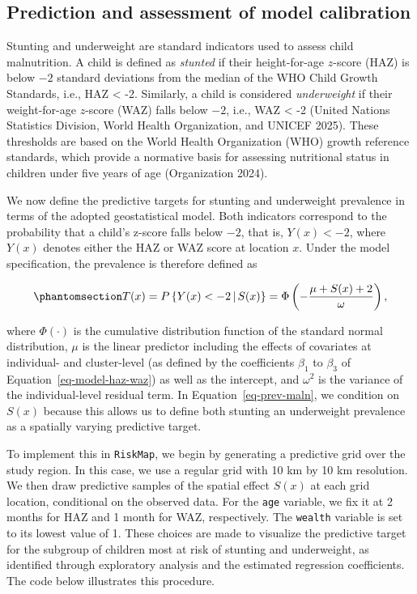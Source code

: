 \documentclass[
  letterpaper,
]{krantz}
\begin{document}
\subsection{Prediction and assessment of model
calibration}\label{prediction-and-assessment-of-model-calibration}

Stunting and underweight are standard indicators used to assess child
malnutrition. A child is defined as \textit{stunted} if their
height-for-age \(z\)-score (HAZ) is below \(-2\) standard deviations
from the median of the WHO Child Growth Standards, i.e., HAZ \textless{}
-2. Similarly, a child is considered \textit{underweight} if their
weight-for-age \(z\)-score (WAZ) falls below \(-2\), i.e., WAZ
\textless{} -2 (United Nations Statistics Division, World Health
Organization, and UNICEF 2025). These thresholds are based on the World
Health Organization (WHO) growth reference standards, which provide a
normative basis for assessing nutritional status in children under five
years of age (Organization 2024).

We now define the predictive targets for stunting and underweight
prevalence in terms of the adopted geostatistical model. Both indicators
correspond to the probability that a child's z-score falls below \(-2\),
that is, \(Y(x) < -2\), where \(Y(x)\) denotes either the HAZ or WAZ
score at location \(x\). Under the model specification, the prevalence
is therefore defined as

\begin{equation}\phantomsection\label{eq-prev-maln}{
T(x) = P\left\{ Y(x) < -2 \,\middle|\, S(x) \right\} = \Phi\left( -\frac{\mu + S(x) + 2}{\omega} \right),
}\end{equation}

where \(\Phi(\cdot)\) is the cumulative distribution function of the
standard normal distribution, \(\mu\) is the linear predictor including
the effects of covariates at individual- and cluster-level (as defined
by the coefficients \(\beta_1\) to \(\beta_3\) of
Equation~\ref{eq-model-haz-waz}) as well as the intercept, and
\(\omega^2\) is the variance of the individual-level residual term. In
Equation~\ref{eq-prev-maln}, we condition on \(S(x)\) because this
allows us to define both stunting an underweight prevalence as a
spatially varying predictive target.

To implement this in \texttt{RiskMap}, we begin by generating a
predictive grid over the study region. In this case, we use a regular
grid with 10 km by 10 km resolution. We then draw predictive samples of
the spatial effect \(S(x)\) at each grid location, conditional on the
observed data. For the \texttt{age} variable, we fix it at 2 months for
HAZ and 1 month for WAZ, respectively. The \texttt{wealth} variable is
set to its lowest value of 1. These choices are made to visualize the
predictive target for the subgroup of children most at risk of stunting
and underweight, as identified through exploratory analysis and the
estimated regression coefficients. The code below illustrates this
procedure.
\end{document}
